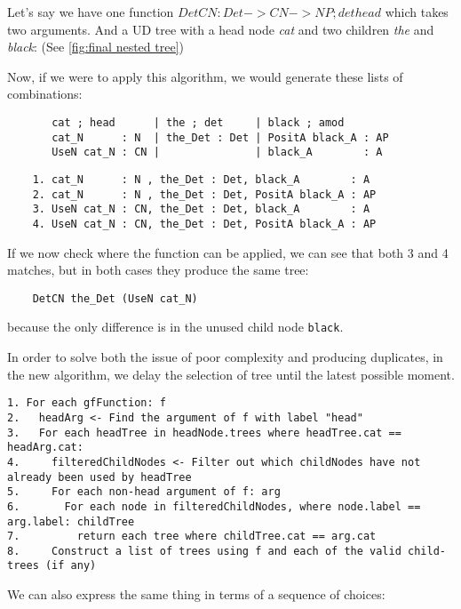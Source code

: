 Let's say we have one function $DetCN : Det -> CN -> NP ; det head$ which takes two arguments.
And a UD tree with a head node \emph{cat} and two children \emph{the} and \emph{black}: (See \autoref{fig:final nested tree})

Now, if we were to apply this algorithm, we would generate these lists of combinations:
\begin{verbatim}
       cat ; head      | the ; det     | black ; amod
       cat_N      : N  | the_Det : Det | PositA black_A : AP
       UseN cat_N : CN |               | black_A        : A
\end{verbatim}

\begin{verbatim}
    1. cat_N      : N , the_Det : Det, black_A        : A
    2. cat_N      : N , the_Det : Det, PositA black_A : AP
    3. UseN cat_N : CN, the_Det : Det, black_A        : A
    4. UseN cat_N : CN, the_Det : Det, PositA black_A : AP
\end{verbatim}

If we now check where the function can be applied, we can see that both 3 and 4 matches,
but in both cases they produce the same tree:
\begin{verbatim}
    DetCN the_Det (UseN cat_N)
\end{verbatim}
because the only difference is in the unused child node \verb|black|.

In order to solve both the issue of poor complexity and producing duplicates, in the new algorithm, we delay the selection of tree until the latest possible moment.




\begin{verbatim}
1. For each gfFunction: f
2.   headArg <- Find the argument of f with label "head"
3.   For each headTree in headNode.trees where headTree.cat == headArg.cat:
4.     filteredChildNodes <- Filter out which childNodes have not already been used by headTree
5.     For each non-head argument of f: arg
6.       For each node in filteredChildNodes, where node.label == arg.label: childTree
7.         return each tree where childTree.cat == arg.cat
8.     Construct a list of trees using f and each of the valid child-trees (if any)
\end{verbatim}

We can also express the same thing in terms of a sequence of choices:

